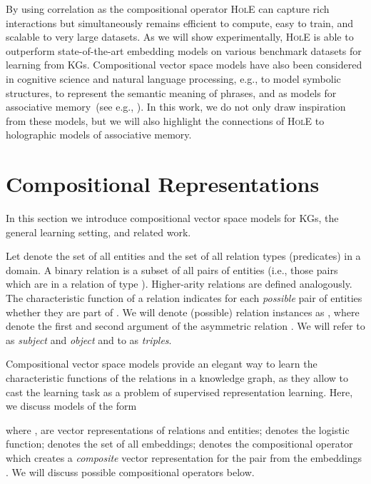 \documentclass[letterpaper]{article}
\newcommand{\hole}{\textsc{HolE}\xspace}
\begin{document}
By using correlation as the compositional operator \hole can capture rich
interactions but simultaneously remains efficient to compute, easy to train, and
scalable to very large datasets.
As we will show experimentally, \hole is able to outperform
state-of-the-art embedding models on various benchmark
datasets for learning from KGs.
Compositional vector space models have also been considered in cognitive science
and natural language processing, e.g., to model symbolic structures, to
represent the semantic meaning of phrases, and as models for associative
memory~(see e.g.,
\cite{smolensky_tensor_1990,plate1995holographic,mitchell-lapata:2008:ACLMain,socher2012semantic}).
In this work, we do not only draw inspiration from these models, but we will
also highlight the connections of \hole to holographic models of associative
memory.





\section{Compositional Representations}
\label{sec:comp-rep}

In this section we introduce compositional vector space models
for KGs, the general learning setting, and related work. 

Let  denote the set of all entities and  the set of all relation
types (predicates) in a domain.
A binary relation is a subset  of all pairs of
entities (i.e., those pairs which are in a relation of type ). Higher-arity
relations are defined analogously.
The characteristic function  of a
relation  indicates for each \emph{possible} pair of entities whether
they are part of .
We will denote (possible) relation instances as , where  denote the first and second argument of the
asymmetric relation . 
We will refer to  as \emph{subject} and \emph{object}
and to  as \emph{triples}.


Compositional vector space models provide an elegant way to learn the
characteristic functions of the relations in a knowledge graph, as they allow to
cast the learning task as a problem of supervised representation learning.
Here, we discuss models of the form 

where ,  are vector representations
of relations and entities;
 denotes the logistic function;
 denotes the set of
all embeddings;
 denotes the compositional
operator which creates a \emph{composite} vector representation for the pair
 from the embeddings . We will discuss possible
compositional operators below.
\end{document}
